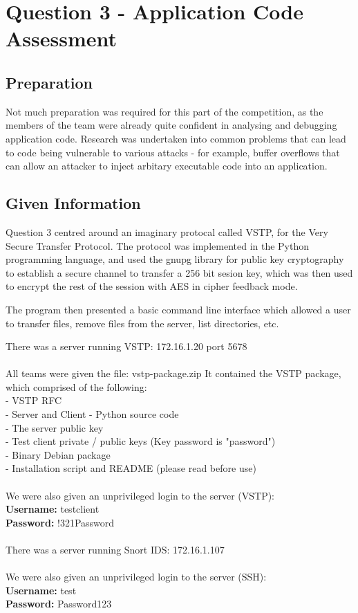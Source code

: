 \chapter{Question 3 - Application Code Assessment}

\section{Preparation}
Not much preparation was required for this part of the competition, as the
members of the team were already quite confident in analysing and debugging
application code. Research was undertaken into common problems that can lead to
code being vulnerable to various attacks - for example, buffer overflows that
can allow an attacker to inject arbitary executable code into an application.

\section{Given Information}
Question 3 centred around an imaginary protocal called VSTP, for the Very 
Secure Transfer Protocol. The protocol was implemented in the Python 
programming language, and used the gnupg library for public key cryptography
to establish a secure channel to transfer a 256 bit sesion key, which was then
used to encrypt the rest of the session with AES in cipher feedback mode.

The program then presented a basic command line interface which allowed a user
to transfer files, remove files from the server, list directories, etc.

There was a server running VSTP: 172.16.1.20 port 5678
\\\\
All teams were given the file: vstp-package.zip
It contained the VSTP package, which comprised of the following:
\\- VSTP RFC
\\- Server and Client - Python source code
\\- The server public key
\\- Test client private / public keys (Key password is "password")
\\- Binary Debian package
\\- Installation script and README (please read before use)
\\\\
We were also given an unprivileged login to the server (VSTP):\\
\textbf{Username:} testclient
\\
\textbf{Password:} !321Password
\\\\
There was a server running Snort IDS: 172.16.1.107
\\\\
We were also given an unprivileged login to the server (SSH):\\
\textbf{Username:} test
\\
\textbf{Password:} Password123

